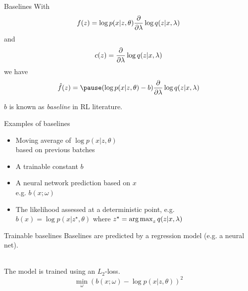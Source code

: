 \begin{frame}{Baselines}
With
\begin{equation*}
f(z) = \log p(x|z, \theta) \pdv{\lambda} \log q(z|x, \lambda)
\end{equation*}
and 
\begin{equation*}
c(z) = \pdv{\lambda} \log q(z|x, \lambda)
\end{equation*}
we have 
\begin{equation*}
\hat f(z) = \pause (\log p(x|z, \theta) - b) \pdv{\lambda} \log q(z|x, \lambda) 
\end{equation*}

\pause
$b$ is known as \emph{baseline} in RL literature.
\end{frame}

\begin{frame}{Examples of baselines}

\begin{itemize}
	\item Moving average of $\log p(x|z, \theta)$ \\
	 based on previous batches \pause
	\item A trainable constant $b$ \pause
	\item A neural network prediction based on $x$\\
	e.g. $b(x; \omega)$ \pause
	\item The likelihood assessed at a deterministic point, e.g. \\
	$b(x) = \log p(x|z^\star, \theta)$ where $z^\star = \operatorname*{arg\,max}_z q(z|x, \lambda)$
\end{itemize}
\end{frame}


\begin{frame}{Trainable baselines}
Baselines are predicted by a regression model (e.g. a neural net). \\

~

The model is trained using 
an $ L_{2} $-loss.
\begin{equation*}
\min_\omega \left(b(x; \omega) - \log p(x|z,\theta)\right)^{2}
\end{equation*}
\end{frame}






